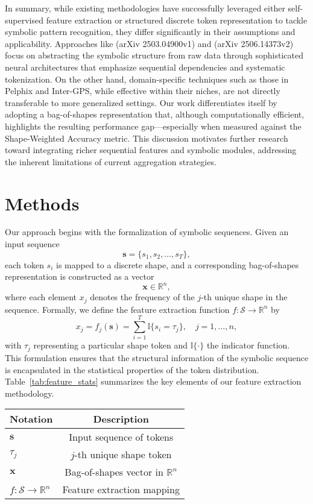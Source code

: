 \documentclass{article}
\begin{document}
In summary, while existing methodologies have successfully leveraged either self-supervised feature extraction or structured discrete token representation to tackle symbolic pattern recognition, they differ significantly in their assumptions and applicability. Approaches like (arXiv 2503.04900v1) and (arXiv 2506.14373v2) focus on abstracting the symbolic structure from raw data through sophisticated neural architectures that emphasize sequential dependencies and systematic tokenization. On the other hand, domain-specific techniques such as those in Pelphix and Inter-GPS, while effective within their niches, are not directly transferable to more generalized settings. Our work differentiates itself by adopting a bag-of-shapes representation that, although computationally efficient, highlights the resulting performance gap—especially when measured against the Shape-Weighted Accuracy metric. This discussion motivates further research toward integrating richer sequential features and symbolic modules, addressing the inherent limitations of current aggregation strategies.

\section{Methods}
Our approach begins with the formalization of symbolic sequences. Given an input sequence 
\[
\boldsymbol{s} = \{s_1, s_2, \dots, s_T\},
\]
each token \( s_i \) is mapped to a discrete shape, and a corresponding bag-of-shapes representation is constructed as a vector 
\[
\boldsymbol{x} \in \mathbb{R}^{n},
\]
where each element \( x_j \) denotes the frequency of the \( j \)-th unique shape in the sequence. Formally, we define the feature extraction function \( f: \mathcal{S} \rightarrow \mathbb{R}^{n} \) by
\[
x_j = f_j(\boldsymbol{s}) = \sum_{i=1}^{T} \mathbb{I}\{ s_i = \tau_j \}, \quad j = 1, \dots, n,
\]
with \( \tau_j \) representing a particular shape token and \( \mathbb{I}\{\cdot\} \) the indicator function. This formulation ensures that the structural information of the symbolic sequence is encapsulated in the statistical properties of the token distribution. Table~\ref{tab:feature_stats} summarizes the key elements of our feature extraction methodology.

\begin{tabular}{l|c}
\textbf{Notation} & \textbf{Description} \\
\hline
\(\boldsymbol{s}\) & Input sequence of tokens \\
\(\tau_j\) & \(j\)-th unique shape token \\
\(\boldsymbol{x}\) & Bag-of-shapes vector in \(\mathbb{R}^{n}\) \\
\(f: \mathcal{S} \rightarrow \mathbb{R}^{n}\) & Feature extraction mapping \\
\end{tabular}
\end{document}
